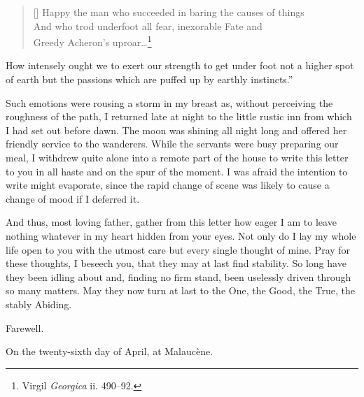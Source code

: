 \settowidth{}
\begin{verse}[\versewidth]
Happy the man who succeeded in baring the causes of things\\
And who trod underfoot all fear, inexorable Fate and\\
Greedy Acheron's uproar\ldots\footnote{Virgil \textit{Georgica} ii.
490--92.}
\end{verse}

\noindent How intensely ought we to exert our strength to get under
foot not a higher spot of earth but the passions which are puffed up
by earthly instincts.''

Such emotions were rousing a storm in my breast as, without perceiving
the roughness of the path, I returned late at night to the little
rustic inn from which I had set out before dawn. The moon was shining
all night long and offered her friendly service to the wanderers.
While the servants were busy preparing our meal, I withdrew quite
alone into a remote part of the house to write this letter to you in
all haste and on the spur of the moment. I was afraid the intention to
write might evaporate, since the rapid change of scene was likely to
cause a change of mood if I deferred it.

And thus, most loving father, gather from this letter how eager I am
to leave nothing whatever in my heart hidden from your eyes. Not only
do I lay my whole life open to you with the utmost care but every
single thought of mine. Pray for these thoughts, I beseech you, that
they may at last find stability. So long have they been idling about
and, finding no firm stand, been uselessly driven through so many
matters. May they now turn at last to the One, the Good, the True, the
stably Abiding.

Farewell.

On the twenty-sixth day of April, at Malauc\`{e}ne.

